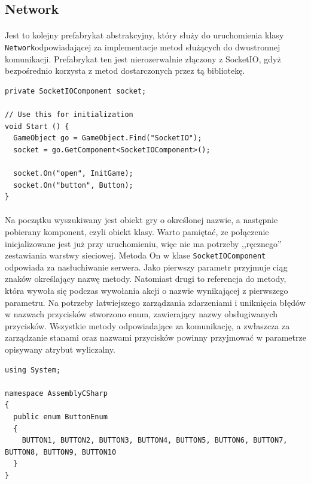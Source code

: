 \subsection{Network}
\paragraph{}
Jest to kolejny prefabrykat abstrakcyjny, który służy do uruchomienia klasy \texttt{Network}odpowiadającej za implementacje metod służących do dwustronnej komunikacji.
Prefabrykat ten jest nierozerwalnie złączony z SocketIO, gdyż bezpośrednio korzysta z metod dostarczonych przez tą bibliotekę.


\begin{lstlisting}[language=CSharp]
private SocketIOComponent socket;

// Use this for initialization
void Start () {
  GameObject go = GameObject.Find("SocketIO");
  socket = go.GetComponent<SocketIOComponent>();

  socket.On("open", InitGame);
  socket.On("button", Button);
}
\end{lstlisting}

\paragraph{}
Na początku wyszukiwany jest obiekt gry o określonej nazwie, a następnie pobierany komponent, czyli obiekt klasy. Warto pamiętać, ze połączenie inicjalizowane jest już przy uruchomieniu, więc nie ma potrzeby ,,ręcznego'' zestawiania warstwy sieciowej.
\newline
Metoda On w klase \texttt{SocketIOComponent} odpowiada za nasłuchiwanie serwera. Jako pierwszy parametr przyjmuje ciąg znaków określający nazwę metody. Natomiast drugi to referencja do metody, która wywoła się podczas wywołania akcji o nazwie wynikającej z pierwszego parametru.
\newline
Na potrzeby łatwiejszego zarządzania zdarzeniami i uniknięcia błędów w nazwach przycisków stworzono enum, zawierający nazwy obsługiwanych przycisków. Wszystkie metody odpowiadające za komunikację, a zwłaszcza za zarządzanie stanami oraz nazwami przycisków powinny przyjmować w parametrze opisywany atrybut wyliczalny.
\newpage

\begin{lstlisting}[language=CSharp]
using System;

namespace AssemblyCSharp
{
  public enum ButtonEnum
  {
    BUTTON1, BUTTON2, BUTTON3, BUTTON4, BUTTON5, BUTTON6, BUTTON7, BUTTON8, BUTTON9, BUTTON10
  }
}

\end{lstlisting}

